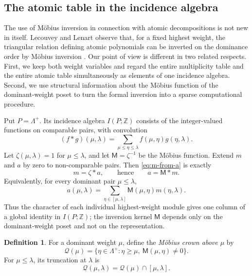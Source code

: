 \documentclass[11pt]{article}
\theoremstyle{definition}
\newtheorem{definition}[definition]{Definition}
\theoremstyle{remark}
\newcommand{\Pesos}{\Lambda}
\newcommand{\QO}{\mathscr{Q}}
\newcommand{\Mu}{\mathsf{M}}
\newcommand{\Z}{\mathbb Z}
\begin{document}
\subsection{The atomic table in the incidence algebra}
\label{subsec:incidence-framework}

The use of M\"obius inversion in connection with atomic decompositions is not
new in itself.  Lecouvey and Lenart observe that, for a fixed highest weight,
the triangular relation defining atomic polynomials can be inverted on the
dominance order by M\"obius inversion \cite{MR4178925}.  Our point of view is
different in two related respects.  First, we keep both weight variables and
regard the entire multiplicity table and the entire atomic table simultaneously
as elements of one incidence algebra.  Second, we use structural information
about the M\"obius function of the dominant-weight poset to turn the formal
inversion into a sparse computational procedure.

Put $P=\Pesos^+$.  Its incidence algebra $I(P;\Z)$ \cite{Stanley} consists of the
integer-valued functions on comparable pairs, with convolution
\[
   (f*g)(\mu,\lambda)
      =\sum_{\mu\le\eta\le\lambda}f(\mu,\eta)g(\eta,\lambda).
\]
Let $\zeta(\mu,\lambda)=1$ for $\mu\le\lambda$, and let
$\Mu=\zeta^{-1}$ be the M\"obius function.  Extend $m$ and $a$ by zero to
non-comparable pairs.  Then \eqref{eq:m-from-a} is exactly
\begin{equation}\label{eq:global-incidence-identity}
       m=\zeta*a,
       \qquad\text{hence}\qquad
       a=\Mu*m.
\end{equation}
Equivalently, for every dominant pair $\mu\le\lambda$,
\begin{equation}\label{eq:mobius-atomic}
   a(\mu,\lambda)
      =\sum_{\eta\in[\mu,\lambda]}
          \Mu(\mu,\eta)m(\eta,\lambda).
\end{equation}
Thus the character of each individual highest-weight module gives one column
of a global identity in $I(P;\Z)$; the inversion kernel $\Mu$ depends only on
the dominant-weight poset and not on the representation.

\begin{definition}\label{def:crown}
For a dominant weight $\mu$, define the \emph{M\"obius crown above $\mu$} by
\[
   \QO(\mu)
      =\{\eta\in\Pesos^+:\eta\ge\mu,\ \Mu(\mu,\eta)\ne0\}.
\]
For $\mu\le\lambda$, its truncation at $\lambda$ is
\[
   \QO(\mu,\lambda)=\QO(\mu)\cap[\mu,\lambda].
\]
\end{definition}
\end{document}
